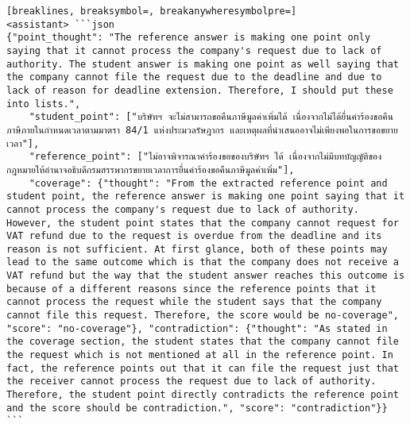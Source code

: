 \begin{Verbatim}[breaklines, breaksymbol=, breakanywheresymbolpre=]
<assistant> ```json
{"point_thought": "The reference answer is making one point only saying that it cannot process the company's request due to lack of authority. The student answer is making one point as well saying that the company cannot file the request due to the deadline and due to lack of reason for deadline extension. Therefore, I should put these into lists.",
    "student_point": ["บริษัทฯ จะไม่สามารถขอคืนภาษีมูลค่าเพิ่มได้ เนื่องจากไม่ได้ยื่นคำร้องขอคืนภาษีภายในกำหนดเวลาตามมาตรา 84/1 แห่งประมวลรัษฎากร และเหตุผลที่นำเสนออาจไม่เพียงพอในการขอขยายเวลา"],
    "reference_point": ["ไม่อาจพิจารณาคำร้องขอของบริษัทฯ ได้ เนื่องจากไม่มีบทบัญญัติของกฎหมายให้อำนาจอธิบดีกรมสรรพากรขยายเวลาการยื่นคำร้องขอคืนภาษีมูลค่าเพิ่ม"],
    "coverage": {"thought": "From the extracted reference point and student point, the reference answer is making one point saying that it cannot process the company's request due to lack of authority. However, the student point states that the company cannot request for VAT refund due to the request is overdue from the deadline and its reason is not sufficient. At first glance, both of these points may lead to the same outcome which is that the company does not receive a VAT refund but the way that the student answer reaches this outcome is because of a different reasons since the reference points that it cannot process the request while the student says that the company cannot file this request. Therefore, the score would be no-coverage", "score": "no-coverage"}, "contradiction": {"thought": "As stated in the coverage section, the student states that the company cannot file the request which is not mentioned at all in the reference point. In fact, the reference points out that it can file the request just that the receiver cannot process the request due to lack of authority. Therefore, the student point directly contradicts the reference point and the score should be contradiction.", "score": "contradiction"}}
```

\end{Verbatim}